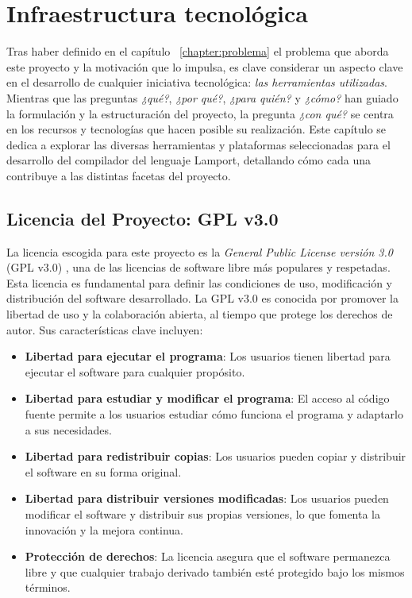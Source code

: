\chapter{\textbf{Infraestructura tecnológica}}
Tras haber definido en el capítulo ~\ref{chapter:problema} el problema que aborda este proyecto y la motivación que lo impulsa, es clave considerar un aspecto clave en el desarrollo de cualquier iniciativa tecnológica: \textit{las herramientas utilizadas}. Mientras que las preguntas \textit{¿qué?}, \textit{¿por qué?}, \textit{¿para quién?} y \textit{¿cómo?} han guiado la formulación y la estructuración del proyecto, la pregunta \textit{¿con qué?} se centra en los recursos y tecnologías que hacen posible su realización. Este capítulo se dedica a explorar las diversas herramientas y plataformas seleccionadas para el desarrollo del compilador del lenguaje Lamport, detallando cómo cada una contribuye a las distintas facetas del proyecto.

\section{Licencia del Proyecto: GPL v3.0}
La licencia escogida para este proyecto es la \textit{General Public License versión 3.0} (GPL v3.0) \cite{gplv3}, una de las licencias de software libre más populares y respetadas. Esta licencia es fundamental para definir las condiciones de uso, modificación y distribución del software desarrollado. La GPL v3.0 es conocida por promover la libertad de uso y la colaboración abierta, al tiempo que protege los derechos de autor. Sus características clave incluyen:

\begin{itemize}
    \item \textbf{Libertad para ejecutar el programa}: Los usuarios tienen libertad para ejecutar el software para cualquier propósito.
    \item \textbf{Libertad para estudiar y modificar el programa}: El acceso al código fuente permite a los usuarios estudiar cómo funciona el programa y adaptarlo a sus necesidades.
    \item \textbf{Libertad para redistribuir copias}: Los usuarios pueden copiar y distribuir el software en su forma original.
    \item \textbf{Libertad para distribuir versiones modificadas}: Los usuarios pueden modificar el software y distribuir sus propias versiones, lo que fomenta la innovación y la mejora continua.
    \item \textbf{Protección de derechos}: La licencia asegura que el software permanezca libre y que cualquier trabajo derivado también esté protegido bajo los mismos términos.
\end{itemize}

